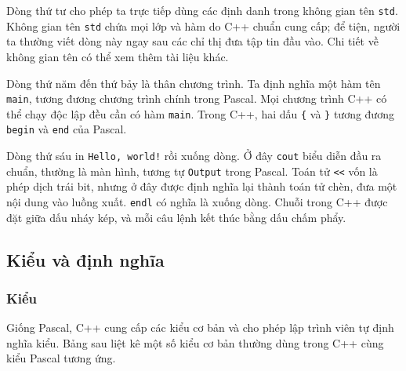 \documentclass[11pt]{article}
\newcommand{\cpp}{C++}
\newcommand{\pascal}{Pascal}
\begin{document}
Dòng thứ tư cho phép ta trực tiếp dùng các định danh trong không gian tên
\verb|std|. Không gian tên \verb|std| chứa mọi lớp và hàm do \cpp{} chuẩn cung
cấp; để tiện, người ta thường viết dòng này ngay sau các chỉ thị đưa tập tin
đầu vào. Chi tiết về không gian tên có thể xem thêm tài liệu khác.

Dòng thứ năm đến thứ bảy là thân chương trình. Ta định nghĩa một hàm tên
\verb|main|, tương đương chương trình chính trong \pascal{}. Mọi chương trình
\cpp{} có thể chạy độc lập đều cần có hàm \verb|main|. Trong \cpp{}, hai dấu
\verb|{| và \verb|}| tương đương \verb|begin| và \verb|end| của \pascal{}.

Dòng thứ sáu in \verb|Hello, world!| rồi xuống dòng. Ở đây \verb|cout| biểu
diễn đầu ra chuẩn, thường là màn hình, tương tự \verb|Output| trong
\pascal{}. Toán tử \verb|<<| vốn là phép dịch trái bit, nhưng ở đây được định
nghĩa lại thành toán tử chèn, đưa một nội dung vào luồng xuất. \verb|endl| có
nghĩa là xuống dòng. Chuỗi trong \cpp{} được đặt giữa dấu nháy kép, và mỗi
câu lệnh kết thúc bằng dấu chấm phẩy.

\subsection{Kiểu và định nghĩa}

\subsubsection*{Kiểu}

Giống \pascal{}, \cpp{} cung cấp các kiểu cơ bản và cho phép lập trình viên
tự định nghĩa kiểu. Bảng sau liệt kê một số kiểu cơ bản thường dùng trong
\cpp{} cùng kiểu \pascal{} tương ứng.
\end{document}
